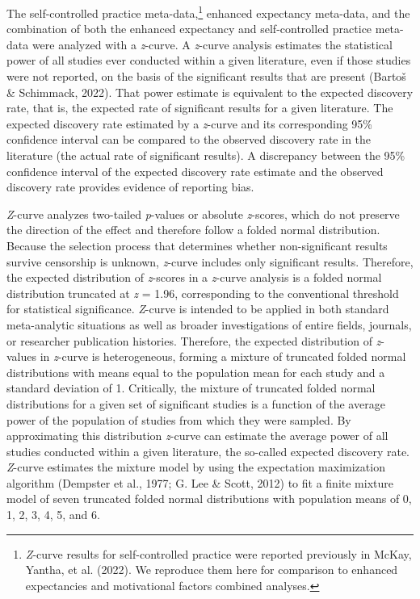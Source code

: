 \documentclass[
  man, donotrepeattitle,mask,floatsintext]{apa7}
\begin{document}
The self-controlled practice meta-data,\footnote{\emph{Z}-curve results for self-controlled practice were reported previously in McKay, Yantha, et al. (2022). We reproduce them here for comparison to enhanced expectancies and motivational factors combined analyses.} enhanced expectancy meta-data, and the combination of both the enhanced expectancy and self-controlled practice meta-data were analyzed with a \emph{z}-curve. A \emph{z}-curve analysis estimates the statistical power of all studies ever conducted within a given literature, even if those studies were not reported, on the basis of the significant results that are present (Bartoš \& Schimmack, 2022). That power estimate is equivalent to the expected discovery rate, that is, the expected rate of significant results for a given literature. The expected discovery rate estimated by a \emph{z}-curve and its corresponding 95\% confidence interval can be compared to the observed discovery rate in the literature (the actual rate of significant results). A discrepancy between the 95\% confidence interval of the expected discovery rate estimate and the observed discovery rate provides evidence of reporting bias.

\emph{Z}-curve analyzes two-tailed \emph{p}-values or absolute \emph{z}-scores, which do not preserve the direction of the effect and therefore follow a folded normal distribution. Because the selection process that determines whether non-significant results survive censorship is unknown, \emph{z}-curve includes only significant results. Therefore, the expected distribution of \emph{z}-scores in a \emph{z}-curve analysis is a folded normal distribution truncated at \emph{z} = 1.96, corresponding to the conventional threshold for statistical significance. \emph{Z}-curve is intended to be applied in both standard meta-analytic situations as well as broader investigations of entire fields, journals, or researcher publication histories. Therefore, the expected distribution of \emph{z}-values in \emph{z}-curve is heterogeneous, forming a mixture of truncated folded normal distributions with means equal to the population mean for each study and a standard deviation of 1. Critically, the mixture of truncated folded normal distributions for a given set of significant studies is a function of the average power of the population of studies from which they were sampled. By approximating this distribution \emph{z}-curve can estimate the average power of all studies conducted within a given literature, the so-called expected discovery rate. \emph{Z}-curve estimates the mixture model by using the expectation maximization algorithm (Dempster et al., 1977; G. Lee \& Scott, 2012) to fit a finite mixture model of seven truncated folded normal distributions with population means of 0, 1, 2, 3, 4, 5, and 6.
\end{document}
